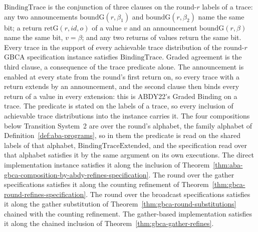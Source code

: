 \begin{theorem}
  \label{thm:aba-gbca-binding-trace}
  \leanok
  $\mathrm{BindingTrace}$ is the conjunction of three clauses on the round-$r$ labels of a trace: any two announcements $\mathrm{boundG}(r,\beta_1)$ and $\mathrm{boundG}(r,\beta_2)$ name the same bit; a return $\mathrm{retG}(r,id,o)$ of a value $v$ and an announcement $\mathrm{boundG}(r,\beta)$ name the same bit, $v = \beta$; and any two returns of values return the same bit.
  Every trace in the support of every achievable trace distribution of the round-$r$ GBCA specification instance satisfies $\mathrm{BindingTrace}$.\leanok{} Graded agreement is the third clause, a consequence of the trace predicate alone.\leanok{}
  The announcement is enabled at every state from the round's first return on, so every trace with a return extends by an announcement, and the second clause then binds every return of a value in every extension: this is ABDY22's Graded Binding on a trace.
  The predicate is stated on the labels of a trace, so every inclusion of achievable trace distributions into the instance carries it.
  The four compositions below Transition System~2 are over the round's alphabet, the family alphabet of Definition~\ref{def:aba-programs}, so in them the predicate is read on the shared labels of that alphabet, $\mathrm{BindingTraceExtended}$, and the specification read over that alphabet satisfies it by the same argument on its own executions.\leanok{}
  The direct implementation instance satisfies it along the inclusion of Theorem~\ref{thm:aba-gbca-composition-by-abdy-refines-specification}.\leanok{}
  The round over the gather specifications satisfies it along the counting refinement of Theorem~\ref{thm:gbca-round-refines-specification}.\leanok{}
  The round over the broadcast specifications satisfies it along the gather substitution of Theorem~\ref{thm:gbca-round-substitutions} chained with the counting refinement.\leanok{}
  The gather-based implementation satisfies it along the chained inclusion of Theorem~\ref{thm:gbca-gather-refines}.\leanok{}
\end{theorem}

